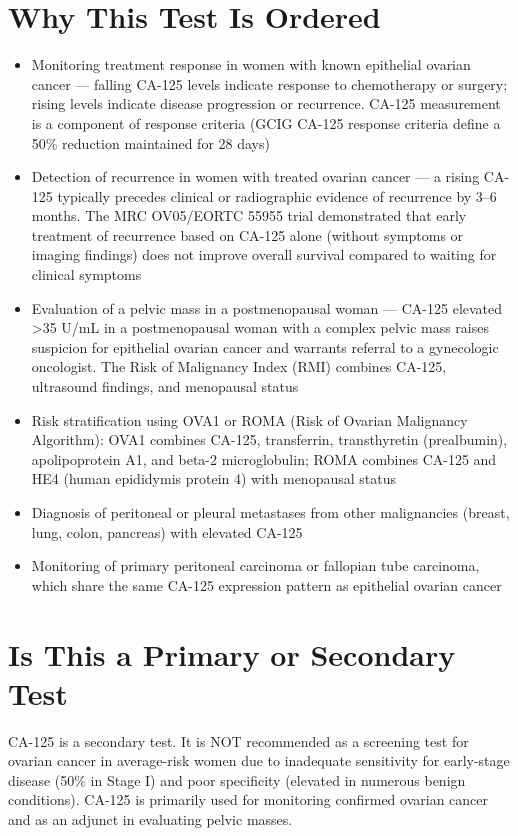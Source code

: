 \section*{Why This Test Is Ordered}
\begin{itemize}
  \item Monitoring treatment response in women with known epithelial ovarian cancer --- falling CA-125 levels indicate response to chemotherapy or surgery; rising levels indicate disease progression or recurrence. CA-125 measurement is a component of response criteria (GCIG CA-125 response criteria define a 50\% reduction maintained for 28 days)
  \item Detection of recurrence in women with treated ovarian cancer --- a rising CA-125 typically precedes clinical or radiographic evidence of recurrence by 3--6 months. The MRC OV05/EORTC 55955 trial demonstrated that early treatment of recurrence based on CA-125 alone (without symptoms or imaging findings) does not improve overall survival compared to waiting for clinical symptoms
  \item Evaluation of a pelvic mass in a postmenopausal woman --- CA-125 elevated >35 U/mL in a postmenopausal woman with a complex pelvic mass raises suspicion for epithelial ovarian cancer and warrants referral to a gynecologic oncologist. The Risk of Malignancy Index (RMI) combines CA-125, ultrasound findings, and menopausal status
  \item Risk stratification using OVA1 or ROMA (Risk of Ovarian Malignancy Algorithm): OVA1 combines CA-125, transferrin, transthyretin (prealbumin), apolipoprotein A1, and beta-2 microglobulin; ROMA combines CA-125 and HE4 (human epididymis protein 4) with menopausal status
  \item Diagnosis of peritoneal or pleural metastases from other malignancies (breast, lung, colon, pancreas) with elevated CA-125
  \item Monitoring of primary peritoneal carcinoma or fallopian tube carcinoma, which share the same CA-125 expression pattern as epithelial ovarian cancer
\end{itemize}

\section*{Is This a Primary or Secondary Test}
CA-125 is a secondary test. It is NOT recommended as a screening test for ovarian cancer in average-risk women due to inadequate sensitivity for early-stage disease (50\% in Stage I) and poor specificity (elevated in numerous benign conditions). CA-125 is primarily used for monitoring confirmed ovarian cancer and as an adjunct in evaluating pelvic masses.

